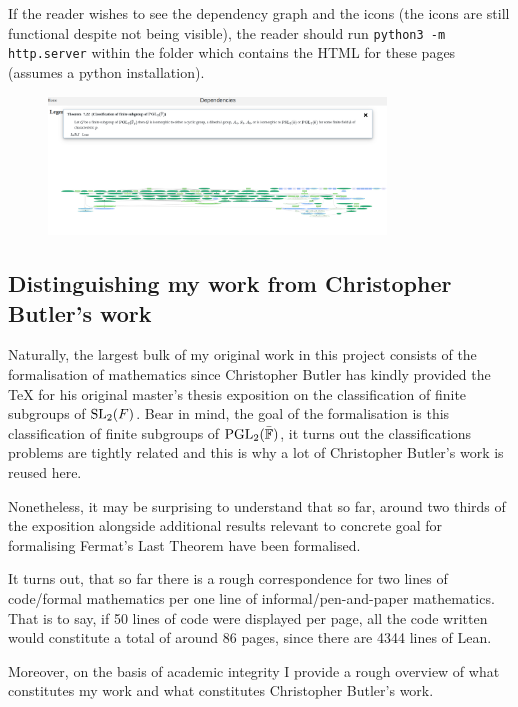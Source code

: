 If the reader wishes to see the dependency graph and the icons (the icons are still functional despite not being visible), the reader should run
\texttt{python3 -m http.server} within the folder which contains the HTML for these pages (assumes a python installation).

\begin{figure}
    \includegraphics[width=0.8\textwidth]{dependencygraph.png}
\end{figure}

\subsection{Distinguishing my work from Christopher Butler's work}


Naturally, the largest bulk of my original work in this project consists of the formalisation of mathematics since Christopher Butler has kindly provided the TeX for his original master's thesis exposition on
the classification of finite subgroups of $\operatorname{SL}_2(F)$. Bear in mind, the goal of the formalisation is this classification of finite subgroups of $\operatorname{PGL}_2(\bar{\mathbb{F}})$, it turns out the classifications problems are tightly
related and this is why a lot of Christopher Butler's work is reused here.

Nonetheless, it may be surprising to understand that so far, around two thirds of the exposition alongside additional results relevant to concrete goal for formalising Fermat's Last Theorem have been formalised.

It turns out, that so far there is a rough correspondence for two lines of code/formal mathematics per one line of informal/pen-and-paper mathematics. That is to say, if 50 lines of code were displayed per page, all
the code written would constitute a total of around 86 pages, since there are 4344 lines of Lean.

Moreover, on the basis of academic integrity I provide a rough overview of what constitutes my work and what constitutes Christopher Butler's work.

